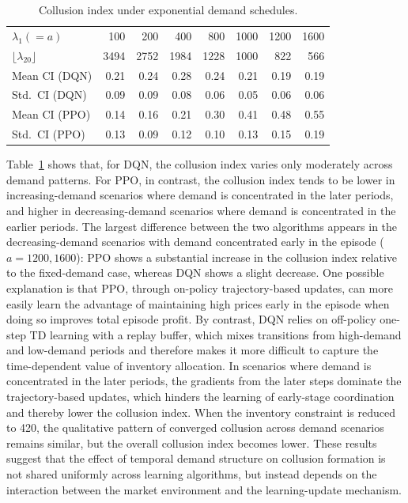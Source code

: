 \documentclass[runningheads]{llncs}
\begin{document}
\begin{table}[tb]
\centering
\caption{Collusion index under exponential demand schedules.}
\label{tab:ppo_exp_collusion}
\small
\setlength{\tabcolsep}{4pt}
\begin{tabular}{lrrrrrrr}
\hline
$\lambda_1(=a)$ & 100 & 200 & 400 & 800 & 1000 & 1200 & 1600 \\
$\lfloor \lambda_{20}\rfloor$ & 3494 & 2752 & 1984 & 1228 & 1000 & 822 & 566 \\
Mean CI (DQN) & 0.21 & 0.24 & 0.28 & 0.24 & 0.21 & 0.19 & 0.19 \\
Std.\ CI (DQN) & 0.09 & 0.09 & 0.08 & 0.06 & 0.05 & 0.06 & 0.06 \\
Mean CI (PPO) & 0.14 & 0.16 & 0.21 & 0.30 & 0.41 & 0.48 & 0.55 \\
Std.\ CI (PPO) & 0.13 & 0.09 & 0.12 & 0.10 & 0.13 & 0.15 & 0.19 \\
\hline
\end{tabular}
\end{table}

Table~\ref{tab:ppo_exp_collusion} shows that, for DQN, the collusion index varies only moderately across demand patterns.
For PPO, in contrast, the collusion index tends to be lower in increasing-demand scenarios where demand is concentrated in the later periods, and higher in decreasing-demand scenarios where demand is concentrated in the earlier periods.
The largest difference between the two algorithms appears in the decreasing-demand scenarios with demand concentrated early in the episode ($a=1200,1600$): PPO shows a substantial increase in the collusion index relative to the fixed-demand case, whereas DQN shows a slight decrease.
One possible explanation is that PPO, through on-policy trajectory-based updates, can more easily learn the advantage of maintaining high prices early in the episode when doing so improves total episode profit.
By contrast, DQN relies on off-policy one-step TD learning with a replay buffer, which mixes transitions from high-demand and low-demand periods and therefore makes it more difficult to capture the time-dependent value of inventory allocation.
In scenarios where demand is concentrated in the later periods, the gradients from the later steps dominate the trajectory-based updates, which hinders the learning of early-stage coordination and thereby lower the collusion index.
When the inventory constraint is reduced to 420, the qualitative pattern of converged collusion across demand scenarios remains similar, but the overall collusion index becomes lower.
These results suggest that the effect of temporal demand structure on collusion formation is not shared uniformly across learning algorithms, but instead depends on the interaction between the market environment and the learning-update mechanism.
\end{document}
